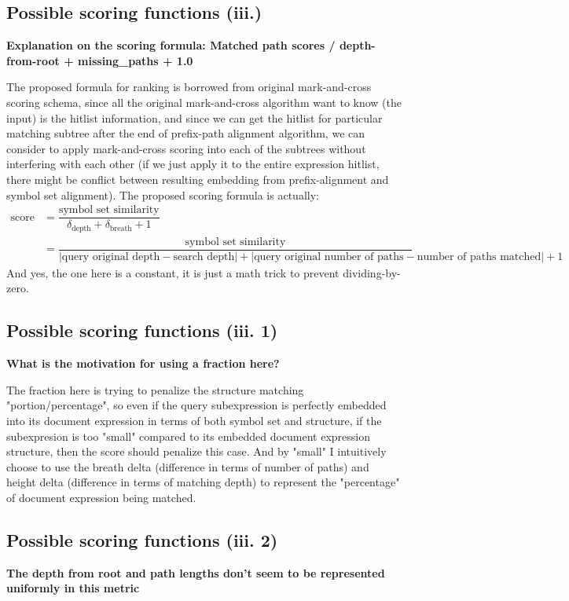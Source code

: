\documentclass[a4paper]{article}
\begin{document}
\subsection{Possible scoring functions (iii.)}
\textbf{Explanation on the scoring formula: Matched path scores / depth-from-root + missing\_paths + 1.0}

The proposed formula for ranking is borrowed from original mark-and-cross scoring schema, since all the original mark-and-cross algorithm want to know (the input) is the hitlist information, and since we can get the hitlist for particular matching subtree after the end of prefix-path alignment algorithm, we can consider to apply mark-and-cross scoring into each of the subtrees without interfering with each other (if we just apply it to the entire expression hitlist, there might be conflict between resulting embedding from prefix-alignment and symbol set alignment). The proposed scoring formula is actually:
$$
\begin{aligned}
\text{score}
&= \dfrac {\text{symbol set similarity}} {\delta_{\text{depth}} + \delta_{\text{breath}} + 1} \\
&= \dfrac {\text{symbol set similarity}} {|\text{query original depth} - \text{search depth}| + |\text{query original number of paths} - \text{number of paths matched}| + 1}
\end{aligned}
$$
And yes, the one here is a constant, it is just a math trick to prevent dividing-by-zero.

\subsection{Possible scoring functions (iii. 1)}
\textbf{What is the motivation for using a fraction here?}

The fraction here is trying to penalize the structure matching "portion/percentage", so even if the query subexpression is perfectly embedded into its document expression in terms of both symbol set and structure, if the subexpresion is too "small" compared to its embedded document expression structure, then the score should penalize this case. And by "small" I intuitively choose to use the breath delta (difference in terms of number of paths) and height delta (difference in terms of matching depth) to represent the "percentage" of document expression being matched.

\subsection{Possible scoring functions (iii. 2)}
\textbf{The depth from root and path lengths don't seem to be represented uniformly in this metric}
\end{document}
